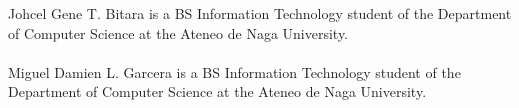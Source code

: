 \begin{vita}

Johcel Gene T. Bitara is a BS Information Technology student of the Department of Computer Science at the Ateneo de Naga University.
\\
\\
Miguel Damien L. Garcera is a BS Information Technology student of the Department of Computer Science at the Ateneo de Naga University.
\\
\\
\end{vita}